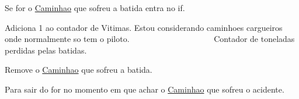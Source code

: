 Se for o \mbox{\hyperlink{class_caminhao}{Caminhao}} que sofreu a batida entra no if.

Adiciona 1 ao contador de Vitimas. Estou considerando caminhoes cargueiros onde normalmente so tem o piloto. ~\newline
~\newline
~\newline
~\newline
~\newline
~\newline
~\newline
~\newline
~\newline
~\newline
~\newline
~\newline
 Contador de toneladas perdidas pelas batidas.

Remove o \mbox{\hyperlink{class_caminhao}{Caminhao}} que sofreu a batida.

Para sair do for no momento em que achar o \mbox{\hyperlink{class_caminhao}{Caminhao}} que sofreu o acidente.

